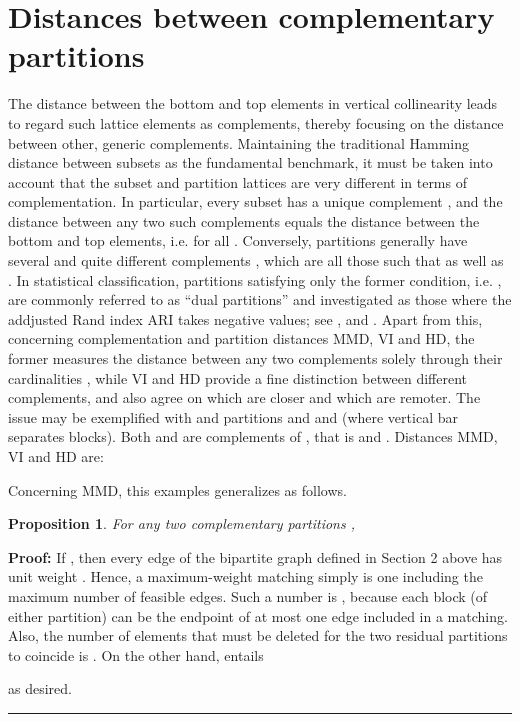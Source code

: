 \documentclass[a4paper,10pt]{article}
\newtheorem{proposition}[theorem]{Proposition}
\newenvironment{proof}[1][Proof]{\noindent\textbf{#1: }}{\ \rule{0.5em}{0.5em}}
\begin{document}
\section{Distances between complementary partitions}
The distance between the bottom and top elements in vertical collinearity leads to regard such lattice elements as complements, thereby focusing on the distance between other,
generic complements. Maintaining the traditional Hamming distance between subsets as the fundamental benchmark, it must be taken into account that the subset and partition
lattices are very different in terms of complementation. In particular, every subset  has a unique complement , and the distance between any two such complements
equals the distance between the bottom and top elements, i.e.  for all . Conversely, partitions  generally have several and quite
different complements \cite{Aigner79}, which are all those  such that  as well as . In statistical classification, partitions 
satisfying only the former condition, i.e. , are commonly referred to as ``dual partitions'' and investigated as those where the addjusted Rand index ARI
\cite{HubertArabie1985} takes negative values; see \cite[pp. 237-238, 389]{Mirkin1996}, \cite[pp. 429-430]{KovalevaMirkin} and \cite{SchreiderSharov1982}. Apart from this,
concerning complementation and partition distances MMD, VI and HD, the former measures the distance between any two complements  solely through their cardinalities ,
while VI and HD provide a fine distinction between different complements, and also agree on which are closer and which are remoter. The issue may be exemplified with
 and partitions  and  and  (where vertical bar  separates blocks). Both  and  are complements of
, that is  and . Distances MMD, VI and HD are:

Concerning MMD, this examples generalizes as follows.

\begin{proposition}
For any two complementary partitions ,

\end{proposition}

\begin{proof}
If , then every edge  of the bipartite graph  defined in Section 2 above has unit weight . Hence, a
maximum-weight matching simply is one including the maximum number of feasible edges. Such a number is , because each block (of either
partition) can be the endpoint of at most one edge included in a matching. Also, the number of elements  that must be deleted for the two residual partitions to coincide
is . On the other hand,  entails

as desired.
\end{proof}
\end{document}
